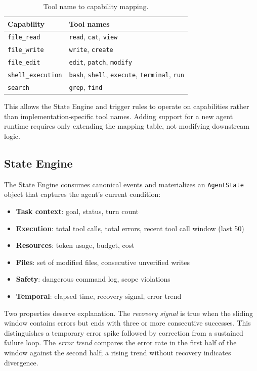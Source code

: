 \documentclass[11pt,a4paper]{article}
\begin{document}
\begin{table}[H]
\centering
\begin{tabular}{ll}
\toprule
\textbf{Capability} & \textbf{Tool names} \\
\midrule
\texttt{file\_read} & \texttt{read}, \texttt{cat}, \texttt{view} \\
\texttt{file\_write} & \texttt{write}, \texttt{create} \\
\texttt{file\_edit} & \texttt{edit}, \texttt{patch}, \texttt{modify} \\
\texttt{shell\_execution} & \texttt{bash}, \texttt{shell}, \texttt{execute}, \texttt{terminal}, \texttt{run} \\
\texttt{search} & \texttt{grep}, \texttt{find} \\
\bottomrule
\end{tabular}
\caption{Tool name to capability mapping.}
\end{table}

This allows the State Engine and trigger rules to operate on capabilities rather than implementation-specific tool names. Adding support for a new agent runtime requires only extending the mapping table, not modifying downstream logic.

\subsection{State Engine}

The State Engine consumes canonical events and materializes an \texttt{AgentState} object that captures the agent's current condition:

\begin{itemize}
\item \textbf{Task context}: goal, status, turn count
\item \textbf{Execution}: total tool calls, total errors, recent tool call window (last 50)
\item \textbf{Resources}: token usage, budget, cost
\item \textbf{Files}: set of modified files, consecutive unverified writes
\item \textbf{Safety}: dangerous command log, scope violations
\item \textbf{Temporal}: elapsed time, recovery signal, error trend
\end{itemize}

Two properties deserve explanation. The \emph{recovery signal} is true when the sliding window contains errors but ends with three or more consecutive successes. This distinguishes a temporary error spike followed by correction from a sustained failure loop. The \emph{error trend} compares the error rate in the first half of the window against the second half; a rising trend without recovery indicates divergence.
\end{document}
